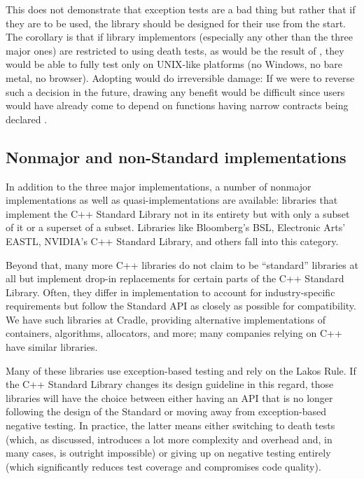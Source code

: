 This does not demonstrate that exception tests are a bad thing but rather that if they are to be used, the library should be designed for their use from the start. The corollary is that if library implementors (especially any other than the three major ones) are restricted to using death tests, as would be the result of \cite{P1656R2}, they would be able to fully test only on UNIX-like platforms (no Windows, no bare metal, no browser). Adopting \cite{P1656R2} would do irreversible damage: If we were to reverse such a decision in the future, drawing any benefit would be difficult  since users would have already come to depend on functions having narrow contracts being declared .

\subsection{Nonmajor and non-Standard implementations}

In addition to the three major implementations, a number of nonmajor implementations as well as quasi-implementations are available: libraries that  implement the C++ Standard Library not in its entirety but with only a subset of it or a superset of a subset. Libraries like Bloomberg's BSL, Electronic Arts' EASTL, NVIDIA's C++ Standard Library, and others fall into this category.

Beyond that, many more C++ libraries do not claim to be ``standard'' libraries at all but implement drop-in replacements for certain parts of the C++ Standard Library. Often, they differ in implementation to account for industry-specific requirements but follow the Standard API as closely as possible for compatibility. We have such libraries at Cradle, providing alternative implementations of containers, algorithms, allocators, and more; many companies relying on C++ have similar libraries.

Many of these libraries use exception-based testing and rely on the Lakos Rule. If the C++ Standard Library changes its design guideline in this regard, those libraries will have the choice between either having an API that is no longer following the design of the Standard or moving away from exception-based negative testing. In practice, the latter means either switching to death tests (which, as discussed, introduces a lot more complexity and overhead and, in many cases, is outright impossible) or giving up on negative testing entirely (which significantly reduces test coverage and compromises code quality).

